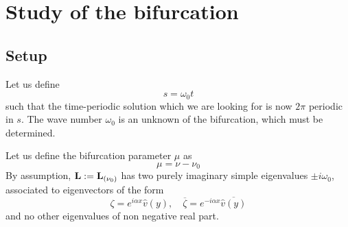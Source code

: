 \documentclass[11pt]{article}
\begin{document}


\section{Study of the bifurcation}






\subsection{Setup}



Let us define
$$
s = \omega_0 t
$$
such that the time-periodic solution which we are looking for is now $2\pi$ periodic in $s$. 
The wave number $\omega_0$ is an unknown of the bifurcation, which must be determined.

Let us define the bifurcation parameter $\mu$ as
$$
\mu = \nu - \nu_0
$$
By assumption, ${\bf L} := {\bf L}_{(\nu_0)}$ has two purely imaginary simple eigenvalues $\pm i \omega_0$,
associated to eigenvectors of the form
\begin{equation} \label{formzeta}
\zeta = e^{i \alpha x} \hat v(y), 
\quad 
\overline{\zeta} = e^{- i \alpha x} \overline{ \hat v(y)}
\end{equation}
and no other eigenvalues of non negative real part.
\end{document}
